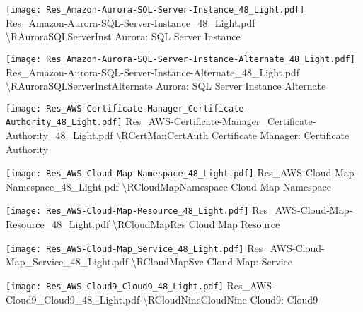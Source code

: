  {\texttt{[image: Res\_Amazon-Aurora-SQL-Server-Instance\_48\_Light.pdf]}} {Res\_Amazon-Aurora-SQL-Server-Instance\_48\_Light.pdf} {{\textbackslash}RAuroraSQLServerInst} {Aurora: SQL Server Instance}

 {\texttt{[image: Res\_Amazon-Aurora-SQL-Server-Instance-Alternate\_48\_Light.pdf]}} {Res\_Amazon-Aurora-SQL-Server-Instance-Alternate\_48\_Light.pdf} {{\textbackslash}RAuroraSQLServerInstAlternate} {Aurora: SQL Server Instance Alternate}

 {\texttt{[image: Res\_AWS-Certificate-Manager\_Certificate-Authority\_48\_Light.pdf]}} {Res\_AWS-Certificate-Manager\_Certificate-Authority\_48\_Light.pdf} {{\textbackslash}RCertManCertAuth} {Certificate Manager: Certificate Authority}

 {\texttt{[image: Res\_AWS-Cloud-Map-Namespace\_48\_Light.pdf]}} {Res\_AWS-Cloud-Map-Namespace\_48\_Light.pdf} {{\textbackslash}RCloudMapNamespace} {Cloud Map Namespace}

 {\texttt{[image: Res\_AWS-Cloud-Map-Resource\_48\_Light.pdf]}} {Res\_AWS-Cloud-Map-Resource\_48\_Light.pdf} {{\textbackslash}RCloudMapRes} {Cloud Map Resource}

 {\texttt{[image: Res\_AWS-Cloud-Map\_Service\_48\_Light.pdf]}} {Res\_AWS-Cloud-Map\_Service\_48\_Light.pdf} {{\textbackslash}RCloudMapSvc} {Cloud Map: Service}

 {\texttt{[image: Res\_AWS-Cloud9\_Cloud9\_48\_Light.pdf]}} {Res\_AWS-Cloud9\_Cloud9\_48\_Light.pdf} {{\textbackslash}RCloudNineCloudNine} {Cloud9: Cloud9}

